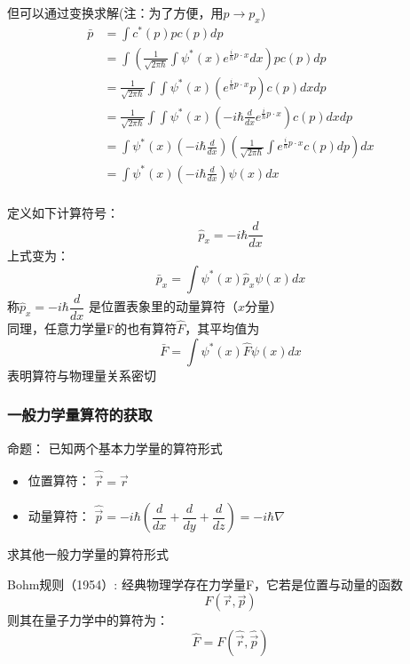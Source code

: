 \begin{frame}
    但可以通过变换求解(注：为了方便，用$p \to p_x$)
    \begin{equation*}
        \begin{split}
            \bar{p}&=\int c^{*}(p) p c(p) d p \\  
            &=\int (\frac{1}{\sqrt{2 \pi \hbar}} \int \psi^{*}(x) e^{\frac{i}{\hbar} p\cdot x} d x) p c\left(p\right) d p \\
            &=\frac{1}{\sqrt{2 \pi \hbar}} \int \int \psi^{*}(x) (e^{\frac{i}{\hbar} p\cdot x}  p) c\left(p\right) d xd p \\
            &=\frac{1}{\sqrt{2 \pi \hbar}} \int \int \psi^{*}(x) (-i\hbar\frac{d}{d x} e^{\frac{i}{\hbar} p\cdot x}) c(p) d xd p \\
            &=\int \psi^{*}(x) (-i\hbar\frac{d}{d x}) (\frac{1}{\sqrt{2 \pi \hbar}} \int e^{\frac{i}{\hbar} p\cdot x} c(p) d p)  d x\\
            &=\int \psi^{*}(x) (-i\hbar\frac{d}{d x}) \psi(x)  d x\\
         \end{split}
    \end{equation*}  
\end{frame} 

\begin{frame}
    定义如下计算符号：
    $$ \hat{p}_x= -i\hbar\frac{d}{d x} $$ 
    上式变为：         
    $$\bar{p}_x=\int \psi^{*}(x) \hat{p}_x \psi(x) d x $$
    称$ \hat{p}_x= -i\hbar\dfrac{d}{d x} $ 是位置表象里的动量算符（$x$分量）\\
    同理，任意力学量F的也有算符$\hat{F}$，其平均值为\\
    $$\bar{F}=\int \psi^{*}(x) \hat{F} \psi(x) d x $$
    表明算符与物理量关系密切
\end{frame} 

\begin{frame} 
    \frametitle{一般力学量算符的获取}
    \begin{tcolorbox1}{命题：}
    已知两个基本力学量的算符形式
    \begin{itemize}
        \item  位置算符： $ \hat{\vec{r}} =\vec{r} $
        \item  动量算符： $ \hat{\vec{p}} =-i\hbar(\dfrac{d}{d x}+ \dfrac{d}{d y} + \dfrac{d}{d z})=-i\hbar \nabla $
    \end{itemize}
    求其他一般力学量的算符形式
    \end{tcolorbox1}
    \alert{Bohm规则（1954）:} 经典物理学存在力学量F，它若是位置与动量的函数
    \[F(\vec{r},\vec{p})\]
    则其在量子力学中的算符为：
    \[\hat{F}=F(\hat{\vec{r}},\hat{\vec{p}})\]
\end{frame} 

